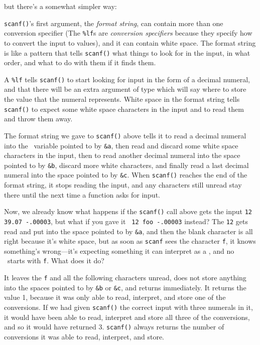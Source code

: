 \noindent but there's a somewhat simpler way:


{\tt scanf()}'s first argument, the {\em format string}\/, can contain
more than one conversion specifier (The {\tt \%lf}s are {\em conversion
specifiers}\/ because they specify how to convert the input to values),
and it can contain white space.  The format string is like a pattern
that tells {\tt scanf()} what things to look for in the input, in what
order, and what to do with them if it finds them.

A {\tt \%lf} tells {\tt scanf()} to start looking for input in the form
of a decimal numeral, and that there will be an extra argument of type
\mbox{\Double} which will say where to store the value that the numeral
represents.  White space in the format string tells {\tt scanf()} to
expect some white space characters in the input and to read them and
throw them away.

The format string we gave to {\tt scanf()} above tells it to read a
decimal numeral into the \double\ variable pointed to by {\tt \&a}, then
read and discard some white space characters in the input, then to read
another decimal numeral into the space pointed to by {\tt\&b}, discard
more white characters, and finally read a last decimal numeral into the
space pointed to by {\tt\&c}.  When {\tt scanf()} reaches the end of the
format string, it stops reading the input, and any characters still
unread stay there until the next time a function asks for input.

Now, we already know what happens if the {\tt scanf()} call above gets
the input \mbox{\tt 12 39.07 -.00003}, but what if you gave it \mbox{\tt
12 foo -.00003} instead?  The {\tt 12} gets read and put into the space
pointed to by {\tt\&a}, and then the blank character is all right
because it's white space, but as soon as {\tt scanf} sees the character
{\tt f}, it knows something's wrong---it's expecting something it can
interpret as a \double, and no \double\ starts with {\tt f}.  What does
it do?

It leaves the {\tt f} and all the following characters unread, does not
store anything into the spaces pointed to by {\tt\&b} or {\tt\&c}, and
returns immediately.  It returns the value 1, because it was only able
to read, interpret, and store one of the conversions.  If we had given
{\tt scanf()} the correct input with three numerals in it, it would have
been able to read, interpret and store all three of the conversions, and
so it would have returned 3.  {\tt scanf()} always returns the number of
conversions it was able to read, interpret, and store.

